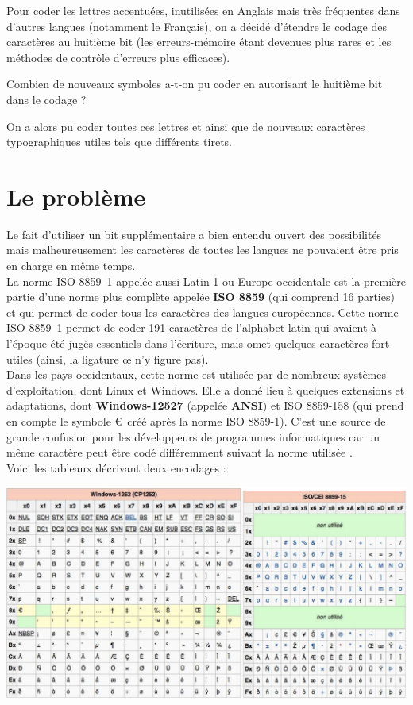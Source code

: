Pour coder les lettres accentuées, inutilisées en Anglais mais très fréquentes dans d'autres langues (notamment le Français), on a décidé
d'étendre
le codage des caractères au huitième bit (les erreurs-mémoire étant devenues plus rares et les méthodes de contrôle d'erreurs plus efficaces).\\


\begin{exercice}[]
    Combien de nouveaux symboles a-t-on pu coder en autorisant le huitième bit dans le codage ?
\end{exercice}


On a alors pu coder toutes ces lettres et ainsi que de nouveaux caractères typographiques utiles tels que différents tirets.\\


\section{Le problème}

Le fait d'utiliser un bit supplémentaire a bien entendu ouvert des possibilités mais malheureusement les caractères de toutes les langues ne
pouvaient être pris en charge
en même temps.\\
La norme ISO 8859–1 appelée aussi Latin-1 ou Europe occidentale est la première partie d'une norme plus complète appelée \textbf{ISO 8859} (qui
comprend 16 parties)
et qui permet de coder tous les caractères des langues européennes. Cette norme ISO 8859–1 permet de coder 191 caractères de l'alphabet latin qui
avaient à
l'époque été jugés essentiels dans l'écriture, mais omet quelques caractères fort utiles (ainsi, la ligature œ n'y figure pas).\\

Dans les pays occidentaux, cette norme est utilisée par de nombreux systèmes d'exploitation, dont Linux et Windows. Elle a donné lieu à quelques
extensions
et adaptations, dont \textbf{Windows-12527} (appelée \textbf{ANSI}) et ISO 8859-158 (qui prend en compte le symbole €\  créé après la norme
ISO 8859-1).
C'est une source de grande confusion pour les développeurs de programmes informatiques car un même caractère peut être codé différemment suivant
la norme utilisée .\\
Voici les tableaux décrivant deux encodages :

\includegraphics[width=\columnwidth]{img/W1252andISO}\\


